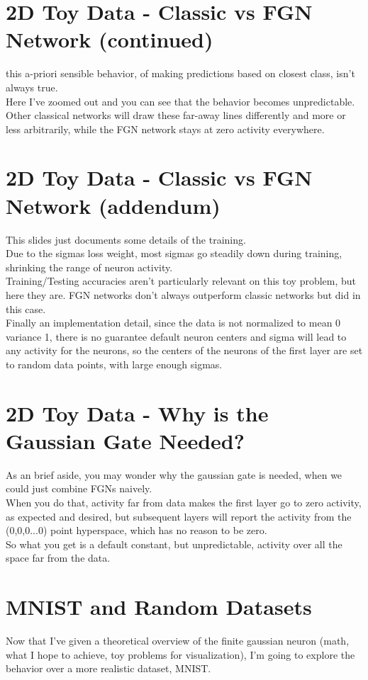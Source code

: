 \documentclass{article}
\begin{document}
\section{2D Toy Data - Classic vs FGN Network (continued)}
this a-priori sensible behavior, of making predictions based on closest class, isn't always true.\\
Here I've zoomed out and you can see that the behavior becomes unpredictable. Other classical networks will draw these far-away lines differently and more or less arbitrarily, while the FGN network stays at zero activity everywhere.

\section{2D Toy Data - Classic vs FGN Network (addendum)}
This slides just documents some details of the training.\\
Due to the sigmas loss weight, most sigmas go steadily down during training, shrinking the range of neuron activity.\\
Training/Testing accuracies aren't particularly relevant on this toy problem, but here they are. FGN networks don't always outperform classic networks but did in this case.\\
Finally an implementation detail, since the data is not normalized to mean 0 variance 1, there is no guarantee default neuron centers and sigma will lead to any activity for the neurons, so the centers of the neurons of the first layer are set to random data points, with large enough sigmas.

\section{2D Toy Data - Why is the Gaussian Gate Needed?}
As an brief aside, you may wonder why the gaussian gate is needed, when we could just combine FGNs naively.\\
When you do that, activity far from data makes the first layer go to zero activity, as expected and desired, but subsequent layers will report the activity from the (0,0,0...0) point hyperspace, which has no reason to be zero.\\
So what you get is a default constant, but unpredictable, activity over all the space far from the data.

\section{MNIST and Random Datasets}
Now that I've given a theoretical overview of the finite gaussian neuron (math, what I hope to achieve, toy problems for visualization), I'm going to explore the behavior over a more realistic dataset, MNIST.
\end{document}
